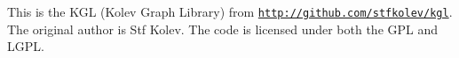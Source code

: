 This is the K\+GL (Kolev Graph Library) from \href{http://github.com/stfkolev/kgl}{\tt http\+://github.\+com/stfkolev/kgl}. The original author is Stf Kolev. The code is licensed under both the G\+PL and L\+G\+PL. 
